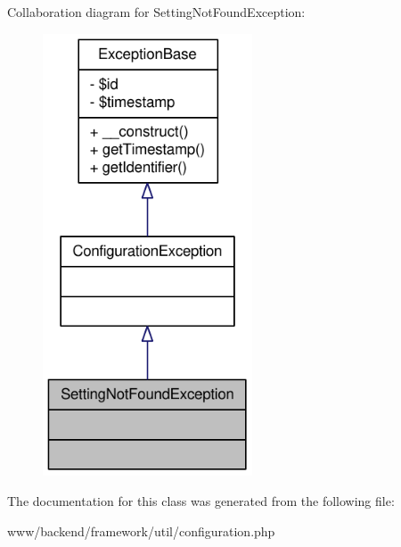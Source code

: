 Collaboration diagram for SettingNotFoundException:\nopagebreak
\begin{figure}[H]
\begin{center}
\leavevmode
\includegraphics[width=176pt]{classSettingNotFoundException__coll__graph}
\end{center}
\end{figure}


The documentation for this class was generated from the following file:\begin{DoxyCompactItemize}
\item 
www/backend/framework/util/configuration.php\end{DoxyCompactItemize}
